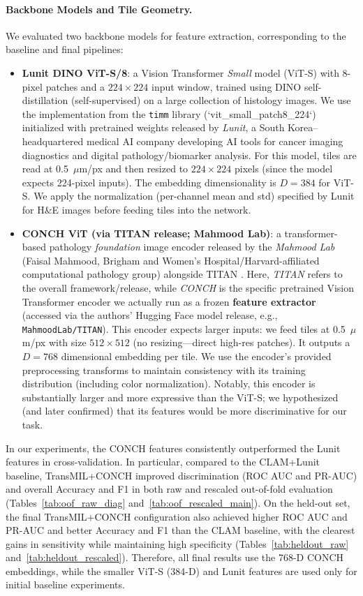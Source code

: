 \paragraph{Backbone Models and Tile Geometry.} We evaluated two backbone models for feature extraction, corresponding to the baseline and final pipelines:
\begin{itemize}
    \item \textbf{Lunit DINO ViT-S/8}: a Vision Transformer \textit{Small} model (ViT-S) with 8-pixel patches and a $224\times224$ input window, trained using DINO self-distillation (self-supervised) on a large collection of histology images. We use the implementation from the \texttt{timm} library (`vit\_small\_patch8\_224`) initialized with pretrained weights released by \emph{Lunit}, a South Korea--headquartered medical AI company developing AI tools for cancer imaging diagnostics and digital pathology/biomarker analysis. For this model, tiles are read at 0.5~$\mu$m/px and then resized to $224\times224$ pixels (since the model expects 224-pixel inputs). The embedding dimensionality is $D=384$ for ViT-S. We apply the normalization (per-channel mean and std) specified by Lunit for H\&E images before feeding tiles into the network.
    \item \textbf{CONCH ViT (via TITAN release; Mahmood Lab)}: a transformer-based pathology \textit{foundation} image encoder released by the \emph{Mahmood Lab} (Faisal Mahmood, Brigham and Women's Hospital/Harvard-affiliated computational pathology group) alongside TITAN \cite{mahmood2024titan}. Here, \emph{TITAN} refers to the overall framework/release, while \emph{CONCH} is the specific pretrained Vision Transformer encoder we actually run as a frozen \textbf{feature extractor} (accessed via the authors' Hugging Face model release, e.g., \texttt{MahmoodLab/TITAN}). This encoder expects larger inputs: we feed tiles at 0.5~$\mu$m/px with size $512\times512$ (no resizing---direct high-res patches). It outputs a $D=768$ dimensional embedding per tile. We use the encoder's provided preprocessing transforms to maintain consistency with its training distribution (including color normalization). Notably, this encoder is substantially larger and more expressive than the ViT-S; we hypothesized (and later confirmed) that its features would be more discriminative for our task.
\end{itemize}


In our experiments, the CONCH features consistently outperformed the Lunit features in cross-validation. In particular, compared to the CLAM+Lunit baseline, TransMIL+CONCH improved discrimination (ROC AUC and PR-AUC) and overall Accuracy and F1 in both raw and rescaled out-of-fold evaluation (Tables~\ref{tab:oof_raw_diag} and~\ref{tab:oof_rescaled_main}). On the held-out set, the final TransMIL+CONCH configuration also achieved higher ROC AUC and PR-AUC and better Accuracy and F1 than the CLAM baseline, with the clearest gains in sensitivity while maintaining high specificity (Tables~\ref{tab:heldout_raw} and~\ref{tab:heldout_rescaled}). Therefore, all final results use the 768-D CONCH embeddings, while the smaller ViT-S (384-D) and Lunit features are used only for initial baseline experiments.

